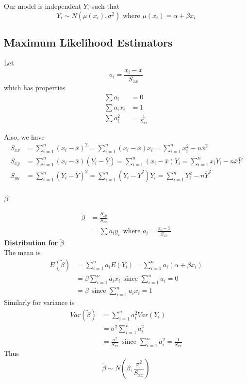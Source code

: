 \documentclass[12pt, leqno]{article}
\theoremstyle{definition}
\begin{document}
  Our model is independent $Y_{i}$ such that
  $$Y_{i} \sim N(\mu(x_{i}), \sigma^{2}) \text{ where } \mu(x_{i}) = \alpha + \beta x_{i}$$

  \subsection{Maximum Likelihood Estimators}
  Let
  $$a_{i} = \frac{x_{i} - \bar{x}}{S_{xx}}$$
  which has properties
  \begin{align*}
  \sum a_{i} &= 0 \\
  \sum a_{i}x_{i} &= 1 \\
  \sum a_{i}^{2} &= \frac{1}{S_{xx}}
  \end{align*}

  Also, we have
  \begin{align*}
  S_{xx} &= \sum_{i=1}^{n}(x_{i} - \bar{x})^{2}
  = \sum_{i=1}^{n}(x_{i} - \bar{x})x_{i}
  = \sum_{i=1}^{n}x_{i}^{2} - n\bar{x}^{2} \\
  S_{xy} &= \sum_{i=1}^{n}(x_{i} - \bar{x})(Y_{i} - \bar{Y})
  = \sum_{i=1}^{n}(x_{i} - \bar{x})Y_{i}
  = \sum_{i=1}^{n}x_{i}Y_{i} - n\bar{x}\bar{Y} \\
  S_{yy} &= \sum_{i=1}^{n}(Y_{i} - \bar{Y})^{2}
  = \sum_{i=1}^{n}(Y_{i} - \bar{Y}^{2})Y_{i}
  = \sum_{i=1}^{n}Y_{i}^{2} - n\bar{Y}^{2}
  \end{align*}

  \subsubsection{$\beta$}
  \begin{align*}
  \widetilde{\beta} &= \frac{S_{xy}}{S_{xx}} \\
  &= \sum a_{i}y_{i}  ~~\text{where } a_{i} = \frac{x_{i} - \bar{x}}{S_{xx}}
  \end{align*}
  \textbf{Distribution for } $\widetilde{\beta}$ \\
  The mean is
  \begin{align*}
  E(\widetilde{\beta}) &= \sum_{i=1}^{n} a_{i}E(Y_{i}) = \sum_{i=1}^{n} a_{i}(\alpha + \beta x_{i}) \\
  &= \beta \sum_{i=1}^{n}a_{i}x_{i} ~~\text{since } \sum_{i=1}^{n} a_{i} = 0 \\
  &= \beta ~~\text{since } \sum_{i=1}^{n} a_{i}x_{i} = 1
  \end{align*}
  Similarly for variance is
  \begin{align*}
  Var(\widetilde{\beta}) &= \sum_{i=1}^{n} a_{i}^{2}Var(Y_{i}) \\
  &= \sigma^{2} \sum_{i=1}^{n} a_{i}^{2} \\
  &= \frac{\sigma^{2}}{S_{xx}} ~~\text{since } \sum_{i=1}^{n}a_{i}^{2} = \frac{1}{S_{xx}}
  \end{align*}
  Thus
  $$\widetilde{\beta} \sim N\left(\beta, \frac{\sigma^{2}}{S_{xx}}\right)$$
\end{document}

